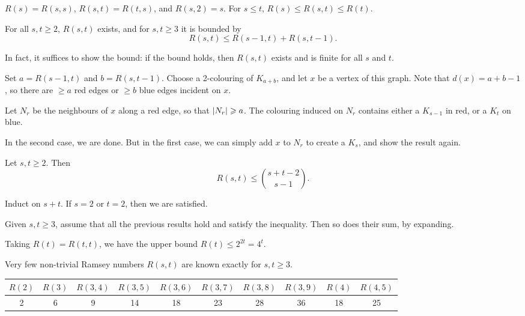 \documentclass{article}
\begin{document}
\begin{note}
	$R(s) = R(s, s)$, $R(s, t) = R(t, s)$, and $R(s, 2) = s$. For $s \leq t$, $R(s) \leq R(s, t) \leq R(t)$.
\end{note}

\begin{theorem}
    \label{ramseys-theorem}
    For all $s, t \geq 2$, $R(s, t)$ exists, and for $s, t \geq 3$ it is bounded by
    \[
	R(s, t) \leq R(s-1, t) + R(s, t-1).
	\]
\end{theorem}

\begin{prf}
    In fact, it suffices to show the bound: if the bound holds, then $R(s, t)$ exists and is finite for all $s$ and $t$.
    
    Set $a = R(s-1, t)$ and $b = R(s, t-1)$. Choose a 2-colouring of $K_{a+b}$, and let $x$ be a vertex of this graph. Note that $d(x) = a + b - 1$, so there are $\geq a$ red edges or $\geq b$ blue edges incident on $x$.
    
    Let $N_r$ be the neighbours of $x$ along a red edge, so that $\left\lvert N_r \right\rvert \geqslant a$. The colouring induced on $N_r$ contains either a $K_{s-1}$ in red, or a $K_t$ on blue.
    
    In the second case, we are done. But in the first case, we can simply add $x$ to $N_r$ to create a $K_s$, and show the result again.
\end{prf}

\begin{corollary}
    Let $s, t \geq 2$. Then
    \[
	R(s, t) \leq \binom{s + t - 2}{s - 1}.
	\]
\end{corollary}

\begin{prf}
    Induct on $s + t$. If $s = 2$ or $t = 2$, then we are satisfied.
    
	Given $s, t \geq 3$, assume that all the previous results hold and satisfy the inequality. Then so does their sum, by expanding.
\end{prf}

\begin{corollary}
    Taking $R(t) = R(t, t)$, we have the upper bound $R(t) \leq 2^{2t} = 4^t$.
\end{corollary}

Very few non-trivial Ramsey numbers $R(s, t)$ are known exactly for $s, t \geq 3$.

\begin{center}
\renewcommand{\arraystretch}{1.5}

\begin{tabular}{|c|*{9}{c|}}
\hline
$R(2)$ & $R(3)$ & $R(3, 4)$ & $R(3, 5)$ & $R(3, 6)$ & $R(3, 7)$ & $R(3, 8)$ & $R(3, 9)$ & $R(4)$ & $R(4, 5)$ \\
\hline
2 & 6 & 9 & 14 & 18 & 23 & 28 & 36 & 18 & 25 \\ \hline
\end{tabular}
\end{center}
\end{document}
